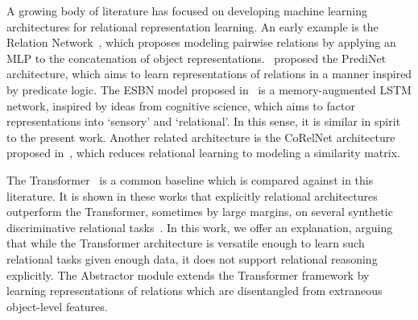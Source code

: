 
% 

A growing body of literature has focused on developing machine learning architectures for relational representation learning. An early example is the Relation Network~\citep{santoro1}, which proposes modeling pairwise relations by applying an MLP to the concatenation of object representations.~\citep{shanahanExplicitlyRelationalNeural} proposed the PrediNet architecture, which aims to learn representations of relations in a manner inspired by predicate logic. The ESBN model proposed in~\citep{esbn} is a memory-augmented LSTM network, inspired by ideas from cognitive science, which aims to factor representations into `sensory' and `relational'. In this sense, it is similar in spirit to the present work. Another related architecture is the CoRelNet architecture proposed in~\citep{kerg2022neural}, which reduces relational learning to modeling a similarity matrix.

The Transformer~\citep{vaswani2017attention} is a common baseline which is compared against in this literature. It is shown in these works that explicitly relational architectures outperform the Transformer, sometimes by large margins, on several synthetic discriminative relational tasks~\citep{shanahanExplicitlyRelationalNeural,esbn,kerg2022neural}. In this work, we offer an explanation, arguing that while the Transformer architecture is versatile enough to learn such relational tasks given enough data, it does not support relational reasoning explicitly. The Abstractor module extends the Transformer framework by learning representations of relations which are disentangled from extraneous object-level features.

